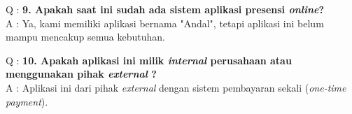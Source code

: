 \noindent Q : \textbf{9. Apakah saat ini sudah ada sistem aplikasi presensi \textit{online}?}
\\ A : Ya, kami memiliki aplikasi bernama "Andal", tetapi aplikasi ini belum mampu mencakup semua kebutuhan.

\noindent Q : \textbf{10. Apakah aplikasi ini milik \textit{internal} perusahaan atau menggunakan pihak \textit{external} ? }
\\ A : Aplikasi ini dari pihak \textit{external} dengan sistem pembayaran sekali (\textit{one-time payment}).